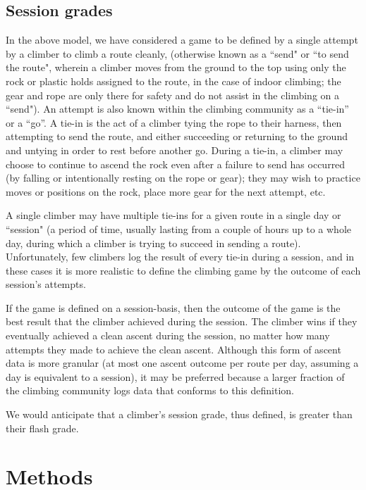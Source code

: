 \documentclass[12pt]{article}
\begin{document}
\subsection{Session grades}

In the above model, we have considered a game to be defined by a single attempt by a climber to climb a route cleanly, (otherwise known as a ``send" or ``to send the route", wherein a climber moves from the ground to the top using only the rock or plastic holds assigned to the route, in the case of indoor climbing; the gear and rope are only there for safety and do not assist in the climbing on a ``send"). An attempt is also known within the climbing community as a ``tie-in'' or a ``go''. A tie-in is the act of a climber tying the rope to their harness, then attempting to send the route, and either succeeding or returning to the ground and untying in order to rest before another go.  During a tie-in, a climber may choose to continue to ascend the rock even after a failure to send has occurred (by falling or intentionally resting on the rope or gear); they may wish to practice moves or positions on the rock, place more gear for the next attempt, etc.

A single climber may have multiple tie-ins for a given route in a single day or ``session" (a period of time, usually lasting from a couple of hours up to a whole day, during which a climber is trying to succeed in sending a route).  Unfortunately, few climbers log the result of every tie-in during a session, and in these cases it is more realistic to define the climbing game by the outcome of each session's attempts.

If the game is defined on a session-basis, then the outcome of the game is the best result that the climber achieved during the session. The climber wins if they eventually achieved a clean ascent during the session, no matter how many attempts they made to achieve the clean ascent. Although this form of ascent data is more granular (at most one ascent outcome per route per day, assuming a day is equivalent to a session), it may be preferred because a larger fraction of the climbing community logs data that conforms to this definition.

We would anticipate that a climber's session grade, thus defined, is greater than their flash grade.

\section{Methods}
\end{document}
